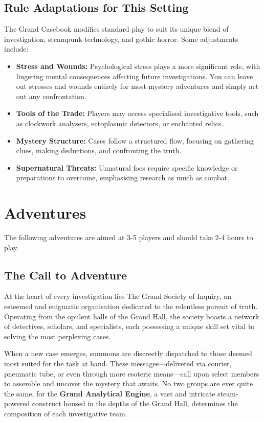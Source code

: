\subsection{Rule Adaptations for This Setting}

The Grand Casebook modifies standard play to suit its unique blend of investigation, steampunk technology, and gothic horror. Some adjustments include:

\begin{itemize}
    \item \textbf{Stress and Wounds:} Psychological stress plays a more significant role, with lingering mental consequences affecting future investigations. You can leave out stresses and wounds entirely for most mystery adventures and simply act out any confrontation.
    \item \textbf{Tools of the Trade:} Players may access specialised investigative tools, such as clockwork analysers, ectoplasmic detectors, or enchanted relics.
    \item \textbf{Mystery Structure:} Cases follow a structured flow, focusing on gathering clues, making deductions, and confronting the truth.
    \item \textbf{Supernatural Threats:} Unnatural foes require specific knowledge or preparations to overcome, emphasising research as much as combat.
\end{itemize}



\section{Adventures}

The following adventures are aimed at 3-5 players and should take 2-4 hours to play. 

\subsection{The Call to Adventure}

At the heart of every investigation lies The Grand Society of Inquiry, an esteemed and enigmatic organisation dedicated to the relentless pursuit of truth. Operating from the opulent halls of the Grand Hall, the society boasts a network of detectives, scholars, and specialists, each possessing a unique skill set vital to solving the most perplexing cases.

When a new case emerges, summons are discreetly dispatched to those deemed most suited for the task at hand. These messages—delivered via courier, pneumatic tube, or even through more esoteric means—call upon select members to assemble and uncover the mystery that awaits. No two groups are ever quite the same, for the \textbf{Grand Analytical Engine}, a vast and intricate steam-powered construct housed in the depths of the Grand Hall, determines the composition of each investigative team.

